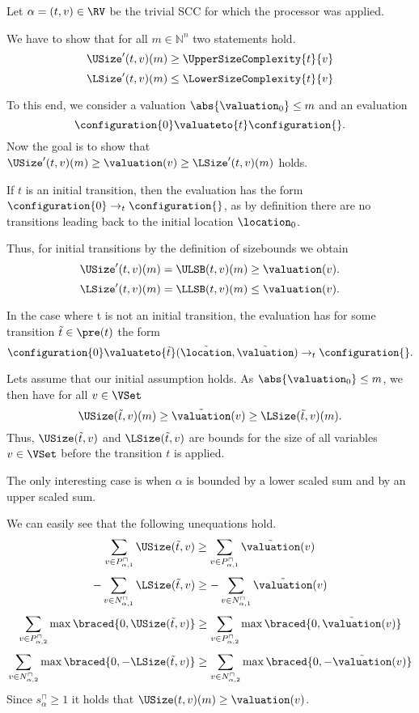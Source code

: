 Let $\alpha = (t, v) \in \RV$ be the trivial SCC for which the processor was applied.

We have to show that for all $m \in \mathbb{N}^n$ two statements hold.
\[ \USize'(t, v)(m) \geq \UpperSizeComplexity{t}{v} \]
\[ \LSize'(t, v)(m) \leq \LowerSizeComplexity{t}{v} \]

To this end, we consider a valuation $\abs{\valuation_0} \leq m$ and an evaluation
\[ \configuration{0} \valuateto{t} \configuration{} . \]
Now the goal is to show that $\USize'(t, v)(m) \geq \valuation(v) \geq \LSize'(t, v)(m)$ holds.

If $t$ is an initial transition, then the evaluation has the form $\configuration{0} \rightarrow_t \configuration{}$, as by definition there are no transitions leading back to the initial location $\location_0$.

Thus, for initial transitions by the definition of sizebounds we obtain
\[ \USize'(t, v)(m) = \ULSB(t, v)(m) \geq \valuation(v). \]
\[ \LSize'(t, v)(m) = \LLSB(t, v)(m) \leq \valuation(v). \]

In the case where t is not an initial transition, the evaluation has for some transition $\tilde{t} \in \pre(t)$ the form
\[ \configuration{0}  \valuateto{\tilde{t}} (\tilde{\location}, \tilde{\valuation}) \rightarrow_t \configuration{}. \]

Lets assume that our initial assumption holds.
As $\abs{\valuation_0} \leq m$, we then have for all $v \in \VSet$
\[ \USize(\tilde{t}, v)(m) \geq \tilde{\valuation}(v) \geq \LSize(\tilde{t}, v)(m). \]
Thus, $\USize(\tilde{t}, v)$ and $\LSize(\tilde{t}, v)$ are bounds for the size of all variables $v \in \VSet$ before the transition $t$ is applied.

The only interesting case is when $\alpha$ is bounded by a lower scaled sum and by an upper scaled sum.

We can easily see that the following unequations hold.
\[ \sum_{v \in P_{\alpha,1}^\sqcap} \USize(\tilde{t}, v) \geq \sum_{v \in P_{\alpha,1}^\sqcap} \tilde{\valuation}(v) \]
\[ - \sum_{v \in N_{\alpha,1}^\sqcap} \LSize(\tilde{t}, v) \geq - \sum_{v \in N_{\alpha,1}^\sqcap} \tilde{\valuation}(v) \]
\[ \sum_{v \in P_{\alpha,2}^\sqcap} \max \braced{0,\USize(\tilde{t}, v)} \geq \sum_{v \in P_{\alpha,2}^\sqcap} \max \braced{0,\tilde{\valuation}(v)} \]
\[ \sum_{v \in N_{\alpha,2}^\sqcap} \max \braced{0,-\LSize(\tilde{t}, v)} \geq \sum_{v \in N_{\alpha,2}^\sqcap} \max \braced{0,-\tilde{\valuation}(v)} \]
Since $s^\sqcap_\alpha \geq 1$ it holds that $\USize(t, v)(m) \geq \valuation(v)$.


